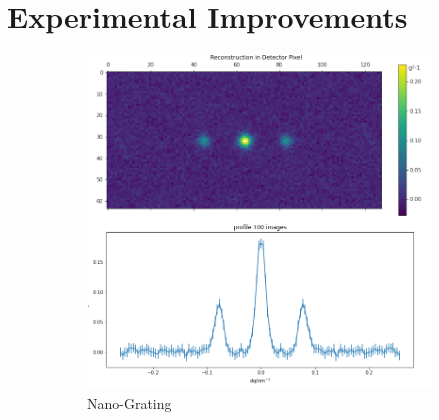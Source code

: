 \section{Experimental Improvements}



\begin{figure}
	\centering
	\begin{subfigure}[b]{0.50\textwidth}
	\includegraphics[width=\linewidth]{images/lv65simA.pdf}
	\caption{Nano-Grating}
	\label{fig:outlook_grating}
\end{subfigure}
\begin{subfigure}[b]{0.37\textwidth}

\end{subfigure}
\end{figure}
